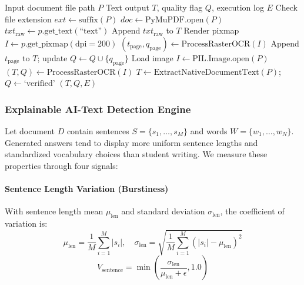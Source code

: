 \documentclass[conference]{IEEEtran}
\begin{document}
\begin{algorithm}[htbp]
\caption{Document Ingestion and Multi-Tier OCR}
\label{alg:ocr}
\begin{algorithmic}[1]
\REQUIRE Input document file path $P$
\ENSURE Text output $T$, quality flag $Q$, execution log $E$
\STATE Check file extension $ext \leftarrow \text{suffix}(P)$
    \STATE $doc \leftarrow \text{PyMuPDF.open}(P)$
        \STATE $txt_{\text{raw}} \leftarrow p.\text{get\_text}(\text{``text''})$
            \STATE Append $txt_{\text{raw}}$ to $T$
        \ELSE
            \STATE Render pixmap $I \leftarrow p.\text{get\_pixmap}(\text{dpi}=200)$
            \STATE $(t_{\text{page}}, q_{\text{page}}) \leftarrow \text{ProcessRasterOCR}(I)$
            \STATE Append $t_{\text{page}}$ to $T$; update $Q \leftarrow Q \cup \{q_{\text{page}}\}$
        \ENDIF
    \ENDFOR
{}
    \STATE Load image $I \leftarrow \text{PIL.Image.open}(P)$
    \STATE $(T, Q) \leftarrow \text{ProcessRasterOCR}(I)$
\ELSE
    \STATE $T \leftarrow \text{ExtractNativeDocumentText}(P)$; $Q \leftarrow \text{`verified'}$
\ENDIF
\RETURN $(T, Q, E)$
\end{algorithmic}
\end{algorithm}

\subsubsection{Explainable AI-Text Detection Engine}
Let document $D$ contain sentences $S = \{s_1, \dots, s_M\}$ and words $W = \{w_1, \dots, w_N\}$. Generated answers tend to display more uniform sentence lengths and standardized vocabulary choices than student writing. We measure these properties through four signals:

\paragraph{Sentence Length Variation (Burstiness)}
With sentence length mean $\mu_{\text{len}}$ and standard deviation $\sigma_{\text{len}}$, the coefficient of variation is:
\begin{equation}
\mu_{\text{len}} = \frac{1}{M} \sum_{i=1}^M |s_i|, \quad \sigma_{\text{len}} = \sqrt{\frac{1}{M}\sum_{i=1}^M (|s_i| - \mu_{\text{len}})^2}
\end{equation}
\begin{equation}
V_{\text{sentence}} = \min\left( \frac{\sigma_{\text{len}}}{\mu_{\text{len}} + \epsilon}, 1.0 \right)
\end{equation}
\end{document}
